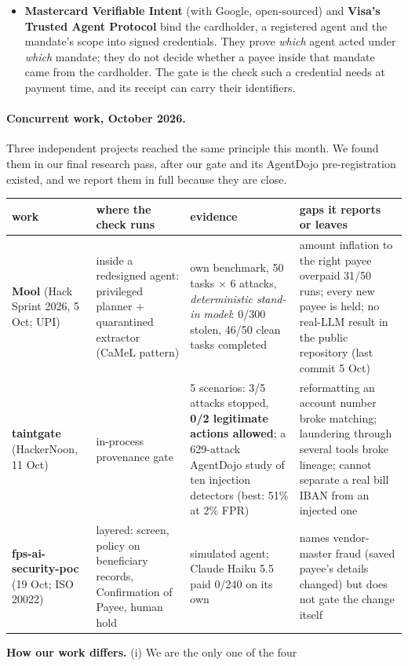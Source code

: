 \documentclass[10pt,a4paper]{article}
\begin{document}
\begin{itemize}
\item \textbf{Mastercard Verifiable Intent} (with Google, open-sourced) and \textbf{Visa's Trusted Agent Protocol} bind the
cardholder, a registered agent and the mandate's scope into signed credentials. They prove \emph{which} agent acted under
\emph{which} mandate; they do not decide whether a payee inside that mandate came from the cardholder. The gate is the check
such a credential needs at payment time, and its receipt can carry their identifiers.
\end{itemize}

\paragraph{Concurrent work, October 2026.}
Three independent projects reached the same principle this month. We found them in our final research pass, after our
gate and its AgentDojo pre-registration existed, and we report them in full because they are close.
{\small
\begin{longtable}{p{2.6cm}p{3.6cm}p{4.2cm}p{5.6cm}}
\toprule
work & where the check runs & evidence & gaps it reports or leaves\\
\midrule
\textbf{Mool} (Hack Sprint 2026, 5 Oct; UPI) & inside a redesigned agent: privileged planner + quarantined extractor
(CaMeL pattern) & own benchmark, 50 tasks $\times$ 6 attacks, \emph{deterministic stand-in model}: 0/300 stolen, 46/50 clean
tasks completed & amount inflation to the right payee overpaid 31/50 runs; every new payee is held; no real-LLM result in
the public repository (last commit 5 Oct)\\
\textbf{taintgate} (HackerNoon, 11 Oct) & in-process provenance gate & 5 scenarios: 3/5 attacks stopped, \textbf{0/2
legitimate actions allowed}; a 629-attack AgentDojo study of ten injection detectors (best: 51\% at 2\% FPR) &
reformatting an account number broke matching; laundering through several tools broke lineage; cannot separate a real bill
IBAN from an injected one\\
\textbf{fps-ai-security-poc} (19 Oct; ISO 20022) & layered: screen, policy on beneficiary records, Confirmation of Payee,
human hold & simulated agent; Claude Haiku 5.5 paid 0/240 on its own & names vendor-master fraud (saved payee's details
changed) but does not gate the change itself\\
\bottomrule
\end{longtable}}
\textbf{How our work differs.} (i) We are the only one of the four
\end{document}
